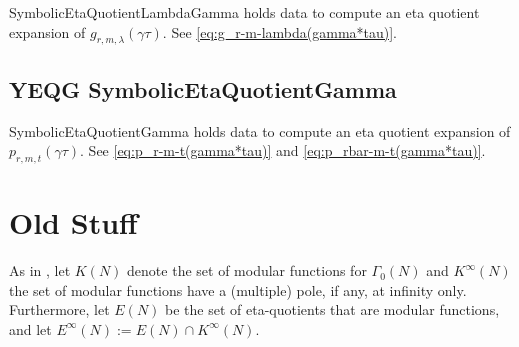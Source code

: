\documentclass{article}
\begin{document}
SymbolicEtaQuotientLambdaGamma holds data to compute an eta quotient
expansion of $g_{r,m,\lambda}(\gamma \tau)$. See
\eqref{eq:g_r-m-lambda(gamma*tau)}.



\subsection{YEQG SymbolicEtaQuotientGamma}

SymbolicEtaQuotientGamma holds data to compute an eta quotient
expansion of $p_{r,m,t}(\gamma \tau)$. See
\eqref{eq:p_r-m-t(gamma*tau)} and \eqref{eq:p_rbar-m-t(gamma*tau)}.









\section{Old Stuff}


\begin{Hemmecke}
As in \cite{Radu_RamanujanKolberg_2015}, let $K(N)$ denote the set of
modular functions for $\Gamma_0(N)$ and $K^\infty(N)$ the set of
modular functions have a (multiple) pole, if any, at infinity only.
Furthermore, let $E(N)$ be the set of eta-quotients that are
modular functions, and let $E^\infty(N) := E(N)\cap K^\infty(N)$.
\end{Hemmecke}
\end{document}

